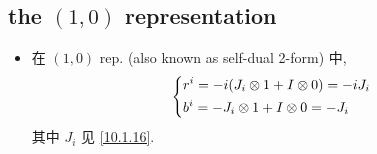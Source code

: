 \subsection{the \texorpdfstring{$(1, 0)$}{(1, 0)} representation}
\begin{itemize}
	\item 在 $(1, 0)$ rep. (also known as self-dual 2-form) 中,
	\begin{equation}
		\begin{dcases}
			r^i = - i (J_i \otimes 1 + I \otimes 0) = - i J_i \\
			b^i = - J_i \otimes 1 + I \otimes 0 = - J_i
		\end{dcases}
	\end{equation}
	其中 $J_i$ 见 \eqref{10.1.16}.
\end{itemize}

